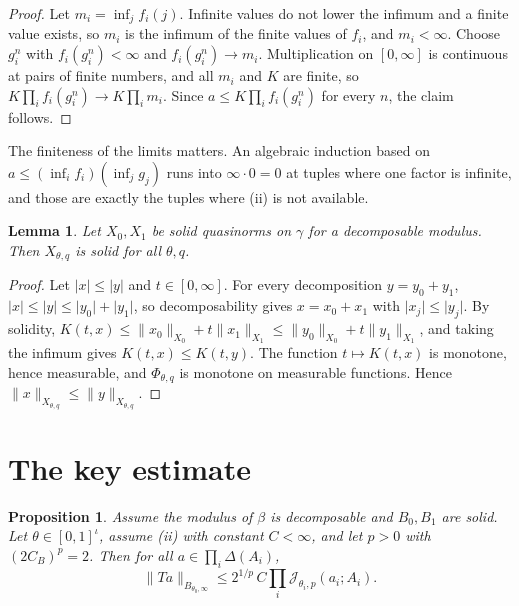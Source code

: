\documentclass[11pt]{article}
\newtheorem{proposition}[theorem]{Proposition}
\newtheorem{lemma}[theorem]{Lemma}
\theoremstyle{definition}
\theoremstyle{remark}
\newcommand{\abs}[1]{\lvert #1\rvert}
\newcommand{\norm}[2]{\lVert #1\rVert_{#2}}
\newcommand{\cJ}{\mathcal J}
\begin{document}
\begin{proof}
  Let \(m_i = \inf_j f_i(j)\). Infinite values do not lower the infimum and a finite value
  exists, so \(m_i\) is the infimum of the finite values of \(f_i\), and \(m_i<\infty\).
  Choose \(g^n_i\) with \(f_i(g^n_i)<\infty\) and \(f_i(g^n_i)\to m_i\). Multiplication on
  \([0,\infty]\) is continuous at pairs of finite numbers, and all \(m_i\) and \(K\) are
  finite, so \(K\prod_i f_i(g^n_i)\to K\prod_i m_i\). Since \(a\le K\prod_i f_i(g^n_i)\) for
  every \(n\), the claim follows.
\end{proof}

The finiteness of the limits matters. An algebraic induction based on
\(a\le(\inf_i f_i)(\inf_j g_j)\) runs into \(\infty\cdot0 = 0\) at tuples where one factor
is infinite, and those are exactly the tuples where (ii) is not available.

\begin{lemma}\label{lem:solid}
  Let \(X_0, X_1\) be solid quasinorms on \(\gamma\) for a decomposable modulus. Then
  \(X_{\theta,q}\) is solid for all \(\theta, q\).
\end{lemma}

\begin{proof}
  Let \(\abs{x}\le\abs{y}\) and \(t\in[0,\infty]\). For every decomposition
  \(y = y_0 + y_1\), \(\abs{x}\le\abs{y}\le\abs{y_0}+\abs{y_1}\), so decomposability gives
  \(x = x_0 + x_1\) with \(\abs{x_j}\le\abs{y_j}\). By solidity,
  \(K(t,x)\le\norm{x_0}{X_0} + t\norm{x_1}{X_1}\le\norm{y_0}{X_0} + t\norm{y_1}{X_1}\), and
  taking the infimum gives \(K(t,x)\le K(t,y)\). The function \(t\mapsto K(t,x)\) is monotone,
  hence measurable, and \(\Phi_{\theta,q}\) is monotone on measurable functions. Hence
  \(\norm{x}{X_{\theta,q}}\le\norm{y}{X_{\theta,q}}\).
\end{proof}

\section{The key estimate}

\begin{proposition}\label{prop:E}
  Assume the modulus of \(\beta\) is decomposable and \(B_0, B_1\) are solid. Let
  \(\theta\in[0,1]^\iota\), assume (ii) with constant \(C<\infty\), and let \(p>0\) with
  \((2C_B)^p = 2\). Then for all \(a\in\prod_i\Delta(A_i)\),
  \[
    \norm{Ta}{B_{\theta_0,\infty}} \le 2^{1/p}\,C\prod_i\cJ_{\theta_i,p}(a_i;A_i).
  \]
\end{proposition}
\end{document}
